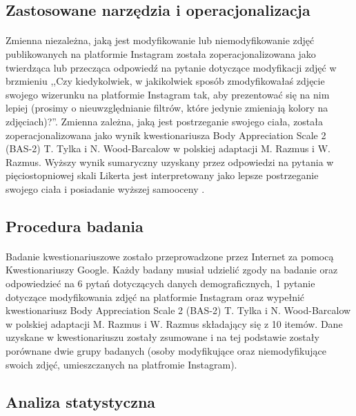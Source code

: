 \documentclass[12pt,a4paper,final,oneside,onecolumn,titlepage]{article}
\begin{document}
\subsection*{\normalsize{\textbf{Zastosowane narzędzia i operacjonalizacja}}}
\paragraph{}
Zmienna niezależna, jaką jest modyfikowanie lub niemodyfikowanie zdjęć publikowanych na platformie Instagram została zoperacjonalizowana jako twierdząca lub przecząca odpowiedź na pytanie dotyczące modyfikacji zdjęć w brzmieniu ,,Czy kiedykolwiek, w jakikolwiek sposób zmodyfikowałaś zdjęcie swojego wizerunku na platformie Instagram tak, aby prezentować się na nim lepiej (prosimy o nieuwzględnianie filtrów, które jedynie zmieniają kolory na zdjęciach)?''. Zmienna zależna, jaką jest postrzeganie swojego ciała, została zoperacjonalizowana jako wynik kwestionariusza Body Appreciation Scale 2 (BAS-2) T. Tylka i N. Wood-Barcalow w polskiej adaptacji M. Razmus i W. Razmus. Wyższy wynik sumaryczny uzyskany przez odpowiedzi na pytania w pięciostopniowej skali Likerta jest interpretowany jako lepsze postrzeganie swojego ciała i posiadanie wyższej samooceny \citep{razmus_evaluating_2017,tylka_body_2015}.
\subsection*{\normalsize{\textbf{Procedura badania}}}
\paragraph{}
Badanie kwestionariuszowe zostało przeprowadzone przez Internet za pomocą Kwestionariuszy Google. Każdy badany musiał udzielić zgody na badanie oraz odpowiedzieć na 6 pytań dotyczących danych demograficznych, 1 pytanie dotyczące modyfikowania zdjęć na platformie Instagram oraz wypełnić kwestionariusz Body Appreciation Scale 2 (BAS-2) T. Tylka i N. Wood-Barcalow w polskiej adaptacji M. Razmus i W. Razmus składający się z 10 itemów. Dane uzyskane w kwestionariuszu zostały zsumowane i na tej podstawie zostały porównane dwie grupy badanych (osoby modyfikujące oraz niemodyfikujące swoich zdjęć, umieszczanych na platfromie Instagram).
\subsection*{\normalsize{\textbf{Analiza statystyczna}}}
\end{document}
